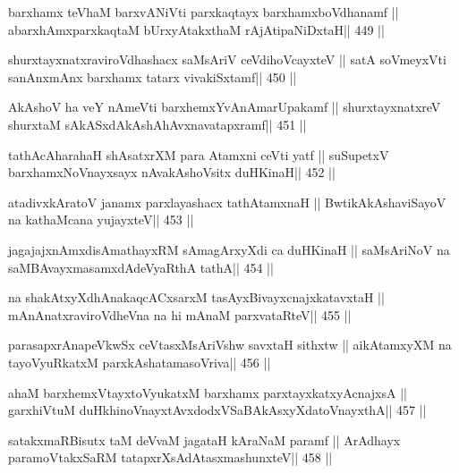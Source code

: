 \begin{shl}
barxhamx teV\s haM barxvANiVti parxkaqtayx barxhamxboVdhanamf ||
abarxhAmxparxkaqtaM bUrxyAtakxthaM rAjA\s tipaNiDxtaH\hfill || 449 ||
\end{shl}

\begin{shl}
shurxtayxnatxraviroVdhashacx saMsAriV ceVdihoVcayxteV ||
satA soVmeyxVti sanAnxmAnx barxhamx tatarx vivakiSxtamf\hfill || 450 ||
\end{shl}

\begin{shl}
AkAshoV ha veY nAmeVti barxhemxYvAnAmarUpakamf ||
shurxtayxnatxreV shurxtaM sAkASxdAkAshAhAvxnavatapxramf\hfill || 451 ||
\end{shl}

\begin{shl}
tathAcAharahaH shAsatxrXM para Atamxni ceVti yatf ||
suSupetxV barxhamxNoV\s nayxsayx nAvakAshoV\s sitx duHKinaH\hfill || 452 ||
\end{shl}

\begin{shl}
atadivxkAratoV janamx parxlayashacx tathA\s\s tamxnaH ||
BwtikAkAshaviSayoV na kathaMcana yujayxteV\hfill || 453 ||
\end{shl}

\begin{shl}
jagajajxnAmxdisAmathayxRM sAmagArxyXdi ca duHKinaH ||
saMsAriNoV na saMBAvayxmasamxdAdeVyaRthA tathA\hfill || 454 ||
\end{shl}

\begin{shl}
na shakAtxyXdhAnakaqcACxsarxM tasAyxBivayxcnajxkatavxtaH ||
mAnAnatxraviroVdheVna na hi mAnaM parxvataRteV\hfill || 455 ||
\end{shl}

\begin{shl}
parasapxrAnapeVkwSx ceVtasxMsAriVshw savxtaH sithxtw ||
aikAtamxyXM na tayoVyuRkatxM parxkAshatamasoVriva\hfill || 456 ||
\end{shl}

\begin{shl}
ahaM barxhemxVtayxtoV\s yukatxM barxhamx parxtayxkatxyA\s cnajxsA ||
garxhiVtuM duHkhinoV\s nayxtAvxdodxVSaBAkAsxyXdatoV\s nayxthA\hfill || 457 ||
\end{shl}

\begin{shl}
satakxmaRBisutx taM deVvaM jagataH kAraNaM paramf ||
ArAdhayx paramoVtakxSaRM tatapxrXsAdAtasxmashunxteV\hfill || 458 ||
\end{shl}

